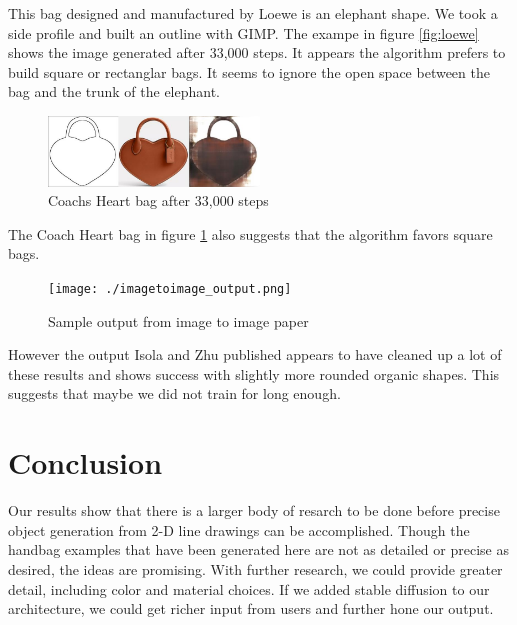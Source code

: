 \documentclass[conference]{IEEEtran}
\begin{document}
This bag designed and manufactured by Loewe is an elephant shape. We took a side profile and built an outline with GIMP. The exampe in figure \ref{fig:loewe} shows the image generated after
33,000 steps. It appears the algorithm prefers to build square or rectanglar bags. It seems to ignore the open space between the bag and the trunk of the elephant. 
\begin{figure}[h]
  \includegraphics[width=0.5\textwidth]{./heart_33000.jpg}
  \caption{\label{fig:coach} Coachs Heart bag after 33,000 steps}
  \centering
\end{figure}
The Coach Heart bag in figure \ref{fig:coach} also suggests that the algorithm favors square bags. 

\begin{figure}[h]
  \texttt{[image: ./imagetoimage\_output.png]}
  \caption{\label{fig:imagetoimage} Sample output from image to image paper \cite{imagetoimage}}
  \centering
\end{figure}
However the output Isola and Zhu \cite{imagetoimage} published appears to have cleaned up a lot of these results and shows success with slightly more rounded organic shapes.
This suggests that maybe we did not train for long enough.

\section{Conclusion}
Our results show that there is a larger body of resarch to be done before precise object generation from 2-D line drawings can be accomplished. Though the handbag examples
that have been generated here are not as detailed or precise as desired, the ideas are promising. With further research, we could provide greater detail, including color and material choices. If we added stable diffusion to our architecture,
we could get richer input from users and further hone our output.
\end{document}
